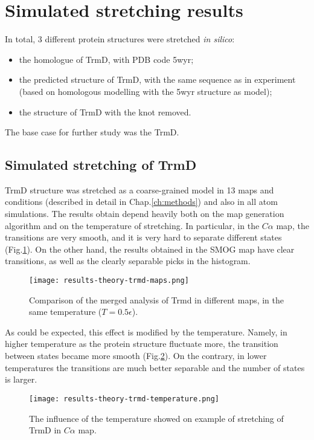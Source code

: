\section{Simulated stretching results}
\label{sec:results-theory}
In total, 3 different protein structures were stretched \textit{in silico}:
\begin{itemize}
    \item the homologue of TrmD, with PDB code 5wyr;
    \item the predicted structure of TrmD, with the same sequence as in experiment (based on homologous modelling with the 5wyr structure as model);
    \item the structure of TrmD with the knot removed.
\end{itemize}

The base case for further study was the TrmD\@.

\subsection{Simulated stretching of TrmD}
\label{subsec:results-theory-trmd}
TrmD structure was stretched as a coarse-grained model in 13 maps and conditions (described in detail in Chap.\ref{ch:methods}) and also in all atom simulations.
The results obtain depend heavily both on the map generation algorithm and on the temperature of stretching.
In particular, in the $C\alpha$ map, the transitions are very smooth, and it is very hard to separate different states (Fig.\ref{fig:results-theory-trmd-maps}).
On the other hand, the results obtained in the SMOG map have clear transitions, as well as the clearly separable picks in the histogram.

\begin{figure}
    \centering
    \texttt{[image: results-theory-trmd-maps.png]}
    \caption{Comparison of the merged analysis of Trmd in different maps, in the same temperature ($T=0.5\epsilon$).}
    \label{fig:results-theory-trmd-maps}
\end{figure}

As could be expected, this effect is modified by the temperature.
Namely, in higher temperature as the protein structure fluctuate more, the transition between states became more smooth (Fig.\ref{fig:results-theory-trmd-temperature}).
On the contrary, in lower temperatures the transitions are much better separable and the number of states is larger.

\begin{figure}
    \centering
    \texttt{[image: results-theory-trmd-temperature.png]}
    \caption{The influence of the temperature showed on example of stretching of TrmD in $C\alpha$ map.}
    \label{fig:results-theory-trmd-temperature}
\end{figure}

